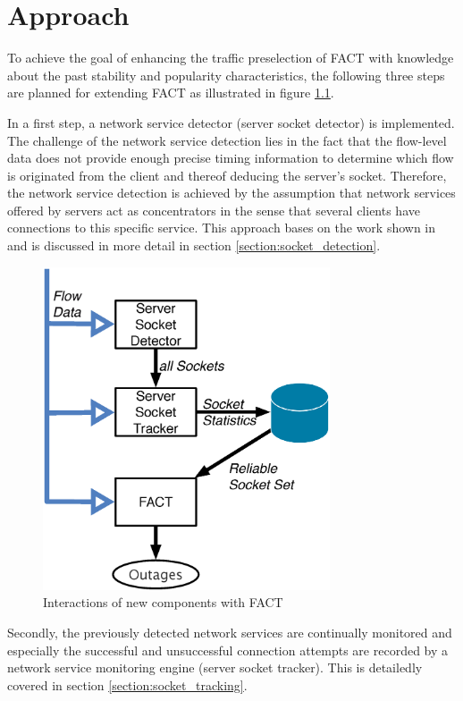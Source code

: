 

\chapter{Approach
\label{chapter:approach}}

To achieve the goal of enhancing the traffic preselection of \gls{FACT} with knowledge about the past stability and popularity characteristics, the following three steps are planned for extending \gls{FACT} as illustrated in figure  \ref{fig:FACT}.

In a first step, a network service detector (server socket detector) is  implemented. 
The challenge of the network service detection lies in the fact  that the flow-level data does not provide enough precise timing information to  determine which flow is originated from the client and thereof deducing the server's socket\citep{Trammell}. 
Therefore, the network service detection is achieved by the assumption that network services offered by servers act as concentrators in the sense that several clients have connections to this specific service. 
This approach bases on the work shown in \cite{Schatzmann:Dissection, Schatzmann:Mining, Schatzmann:Tracing} and is discussed in more detail in section \ref{section:socket_detection}.

\begin{figure}
	[t] \centering
	\includegraphics[width=8.5cm]{images/Approach_blockdiagram.eps}
	\caption{Interactions of new components with \gls{FACT}} 
	\label{fig:FACT} 
\end{figure}

Secondly, the previously detected network services are continually monitored and especially the successful and unsuccessful connection attempts are recorded by a network service monitoring engine (server socket tracker). This is detailedly covered in section \ref{section:socket_tracking}.

